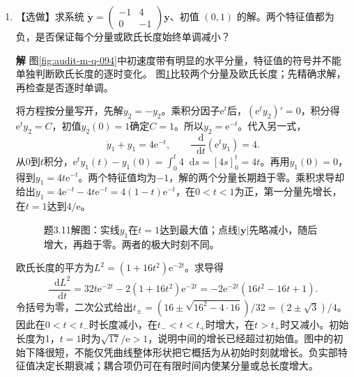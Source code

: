 \documentclass[11pt,openany,fontset=fandol]{ctexbook}
\theoremstyle{plain}\newtheorem{theorem}{定理}[chapter]\newtheorem{proposition}[theorem]{命题}
\theoremstyle{definition}\newtheorem{definition}{定义}[chapter]\newtheorem{example}{例}[chapter]
\theoremstyle{remark}\newtheorem*{remark}{说明}
\newcommand{\SolutionStart}{\par\nobreak\medskip\nobreak\noindent\textbf{解}\quad\ignorespaces}
\newenvironment{solution}{\SolutionStart}{\par\medskip}
\newcommand{\dd}{\mathop{}\!\mathrm d}\newcommand{\ii}{\mathrm i}\newcommand{\ee}{\mathrm e}
\newcommand{\vct}[1]{\bm{#1}}\newcommand{\Rea}{\operatorname{Re}}\newcommand{\Ima}{\operatorname{Im}}
\begin{document}
\begin{enumerate}[label=3.\arabic*]
\begin{solution}
最低模要求连接点水平位移相同，而非摆角相同；图中的不同臂长使 $h_1\theta_1=h_2\theta_2$ 一般对应不等幅摆球运动。
\end{solution}

\item \begin{minipage}[t]{\linewidth}
【选做】求系统 $\dot{\vct y}=\begin{pmatrix}-1&4\\0&-1\end{pmatrix}\vct y$、初值 $(0,1)$ 的解。两个特征值都为负，是否保证每个分量或欧氏长度始终单调减小？
\end{minipage}

\begin{solution}
图\ref{fig:audit-m-q-094}中初速度带有明显的水平分量，特征值的符号并不能单独判断欧氏长度的逐时变化。
图\ref{fig:hw-3-11}比较两个分量及欧氏长度；先精确求解，再检查是否逐时单调。

将方程按分量写开，先解$\dot y_2=-y_2$。乘积分因子$\ee^t$后，$(\ee^ty_2)'=0$，积分得$\ee^ty_2=C$，初值$y_2(0)=1$确定$C=1$。所以$y_2=\ee^{-t}$。代入另一式，
\[
\dot y_1+y_1=4\ee^{-t},\qquad
\frac{\dd}{\dd t}(\ee^t y_1)=4.
\]
从$0$到$t$积分，$\ee^ty_1(t)-y_1(0)=\int_0^t4\dd s=[4s]_0^t=4t$。再用$y_1(0)=0$，得到$y_1=4t\ee^{-t}$。两个特征值均为$-1$，解的两个分量长期趋于零。乘积求导却给出$\dot y_1=4\ee^{-t}-4t\ee^{-t}=4(1-t)\ee^{-t}$，在$0<t<1$为正，第一分量先增长，在$t=1$达到$4/\ee$。

\begin{figure}[H]\centering
{}
\caption{题3.11解图：实线$y_1$在$t=1$达到最大值；点线$|\vct y|$先略减小，随后增大，再趋于零。两者的极大时刻不同。}\label{fig:hw-3-11}
\end{figure}

欧氏长度的平方为$L^2=(1+16t^2)\ee^{-2t}$。求导得
\[
\frac{\dd L^2}{\dd t}
=32t\ee^{-2t}-2(1+16t^2)\ee^{-2t}
=-2\ee^{-2t}(16t^2-16t+1).
\]
令括号为零，二次公式给出$t_\pm=(16\pm\sqrt{16^2-4\cdot16})/32=(2\pm\sqrt3)/4$。
因此在$0<t<t_-$时长度减小，在$t_-<t<t_+$时增大，在$t>t_+$时又减小。初始长度为1，$t=1$时为$\sqrt{17}/\ee>1$，说明中间的增长已经超过初始值。图中的初始下降很短，不能仅凭曲线整体形状把它概括为从初始时刻就增长。负实部特征值决定长期衰减；耦合项仍可在有限时间内使某分量或总长度增大。


\end{solution}
\end{enumerate}
\end{document}
